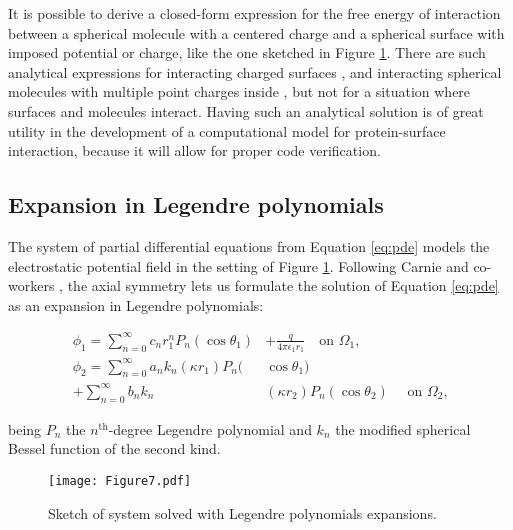 
It is possible to derive a closed-form expression for the free energy of interaction between a spherical molecule with a centered charge and a spherical surface with imposed potential or charge, like the one sketched in Figure \ref{fig:twosphere_an}.  There are such analytical expressions for interacting charged surfaces \cite{CarnieChanGunning1994}, and interacting spherical molecules with multiple point charges inside \cite{LotanHead-Gordon2006}, but not for a situation where surfaces and molecules interact. Having such an analytical solution is of great utility in the development of a computational model for protein-surface interaction, because it will allow for proper code verification. 


\subsection{Expansion in Legendre polynomials} \label{sec:expansion_analytical}


The system of partial differential equations from Equation \eqref{eq:pde}  models the electrostatic potential field in the setting of Figure \ref{fig:twosphere_an}. Following Carnie and co-workers \cite{CarnieChanGunning1994}, the axial symmetry lets us formulate the solution of Equation \eqref{eq:pde} as an expansion in Legendre polynomials:
 

\begin{align} \label{eq:derivation1}
\phi_1 = \sum_{n=0}^{\infty} c_n r_1^n P_n(\cos \theta_1) & + \frac{q}{4\pi\epsilon_1 r_1} \quad \text{on $\Omega_1$,} \nonumber \\
\phi_2 = \sum_{n=0}^{\infty} a_n k_n(\kappa r_1) P_n (& \cos \theta_1) \nonumber \\
+ \sum_{n=0}^{\infty} b_n k_n & (\kappa r_2) P_n(\cos \theta_2) \quad \text{ on $\Omega_2$,}
\end{align}

\noindent being $P_n$ the $n^{\text{th}}$-degree Legendre polynomial and $k_n$ the modified spherical Bessel function of the second kind. 

 

\begin{figure}%
   \centering
   \texttt{[image: Figure7.pdf]} 
   \caption{Sketch of system solved with Legendre polynomials expansions.}
   \label{fig:twosphere_an}
\end{figure}
 

